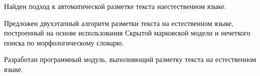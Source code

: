 Найден подход к автоматической разметке текста наестественном языке.

Предложен двухэтапный алгоритм разметки текста на естественном языке, построенный на основе использования Скрытой марковской модели и нечеткого поиска по морфологическому словарю.

Разработан программный модуль, выполняющий разметку текста на естественном языке.